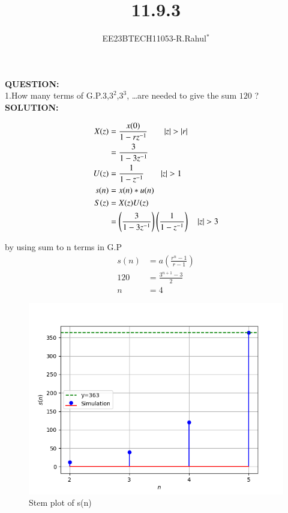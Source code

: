 \documentclass[journal,12pt,twocolumn]{IEEEtran}
\theoremstyle{remark}
\begin{document}

\vspace{3cm}
\title{\textbf{11.9.3}}
\author{EE23BTECH11053-R.Rahul$^{*}$%
}
\maketitle
\newpage
\bigskip

\textbf{QUESTION:}\\
1.How many terms of G.P.$3$,$3^2$,$3^3$, \ldots are needed to give the sum $120$ ?\\

\textbf{SOLUTION:}\\
\vspace{-0.25cm}

\begin{center}
    
\begin{align}
      X(z)&=\frac{x(0)}{1-rz^{-1}} \qquad |z|>|r|\\
      &=\frac{3}{1-3z^{-1}}\\
      U(z)&=\frac{1}{1-z^{-1}} \qquad |z|>1\\
      s(n)&= x(n)*u(n)\\
      S(z)&=X(z)U(z)\\
&=\brak{ \frac{3}{1-3z^{-1}}}\brak{\frac{1}{1-z^{-1}}}\quad|z| > 3 \end{align}
\end{center}
by using sum to n terms in G.P
\begin{align}
    s(n)&=a(\frac{r^{n}-1}{r-1})\\
    120&=\frac{3^{n+1}-3}{2}\\
    n&=4
\end{align}

\begin{figure}
  
  \includegraphics[width=\columnwidth]{figs/graph.png}
  \caption{Stem plot of s(n)}
  \label{fig:your_label}
\end{figure}
\end{document}
